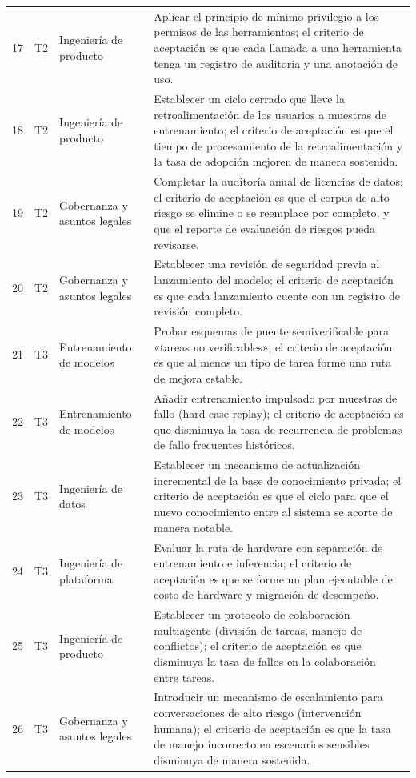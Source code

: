 \begin{longtable}{p{}p{}p{}p{}}
17 & T2 & Ingeniería de producto & Aplicar el principio de mínimo privilegio a los permisos de las herramientas; el criterio de aceptación es que cada llamada a una herramienta tenga un registro de auditoría y una anotación de uso. \\
18 & T2 & Ingeniería de producto & Establecer un ciclo cerrado que lleve la retroalimentación de los usuarios a muestras de entrenamiento; el criterio de aceptación es que el tiempo de procesamiento de la retroalimentación y la tasa de adopción mejoren de manera sostenida. \\
19 & T2 & Gobernanza y asuntos legales & Completar la auditoría anual de licencias de datos; el criterio de aceptación es que el corpus de alto riesgo se elimine o se reemplace por completo, y que el reporte de evaluación de riesgos pueda revisarse. \\
20 & T2 & Gobernanza y asuntos legales & Establecer una revisión de seguridad previa al lanzamiento del modelo; el criterio de aceptación es que cada lanzamiento cuente con un registro de revisión completo. \\
21 & T3 & Entrenamiento de modelos & Probar esquemas de puente semiverificable para «tareas no verificables»; el criterio de aceptación es que al menos un tipo de tarea forme una ruta de mejora estable. \\
22 & T3 & Entrenamiento de modelos & Añadir entrenamiento impulsado por muestras de fallo (hard case replay); el criterio de aceptación es que disminuya la tasa de recurrencia de problemas de fallo frecuentes históricos. \\
23 & T3 & Ingeniería de datos & Establecer un mecanismo de actualización incremental de la base de conocimiento privada; el criterio de aceptación es que el ciclo para que el nuevo conocimiento entre al sistema se acorte de manera notable. \\
24 & T3 & Ingeniería de plataforma & Evaluar la ruta de hardware con separación de entrenamiento e inferencia; el criterio de aceptación es que se forme un plan ejecutable de costo de hardware y migración de desempeño. \\
25 & T3 & Ingeniería de producto & Establecer un protocolo de colaboración multiagente (división de tareas, manejo de conflictos); el criterio de aceptación es que disminuya la tasa de fallos en la colaboración entre tareas. \\
26 & T3 & Gobernanza y asuntos legales & Introducir un mecanismo de escalamiento para conversaciones de alto riesgo (intervención humana); el criterio de aceptación es que la tasa de manejo incorrecto en escenarios sensibles disminuya de manera sostenida. \\

\end{longtable}
